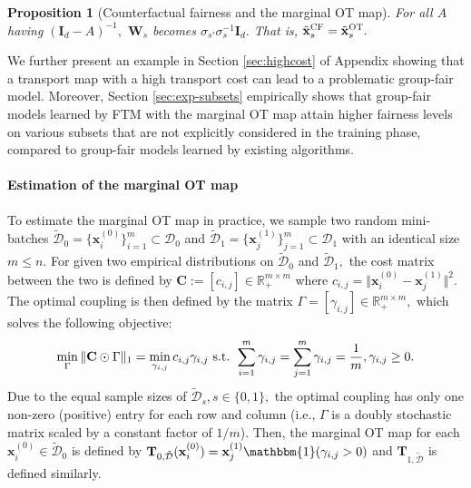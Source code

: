 \documentclass[10pt]{article} %
\newtheorem{proposition}[theorem]{Proposition}
\begin{document}
\begin{proposition}[Counterfactual fairness and the marginal OT map]\label{prop:cf}
    For all $A$ having $(\mathbf{I}_{d}-A)^{-1},$
    $\mathbf{W}_s$ becomes $ \sigma_{s'} \sigma_{s}^{-1} \mathbf{I}_{d}.$
    That is, $\tilde{\mathbf{x}}_{s}^{\textsc{CF}} = \tilde{\mathbf{x}}_{s}^{\textsc{OT}}.$
\end{proposition}

We further present an example in Section \ref{sec:highcost} of Appendix showing that a transport map with a high transport cost can lead to a problematic group-fair model.
Moreover, Section \ref{sec:exp-subsets} empirically shows that group-fair models learned by FTM with the marginal OT map attain higher fairness levels on various subsets that are not explicitly considered in the training phase, compared to group-fair models learned by existing algorithms.

\paragraph{Estimation of the marginal OT map}

To estimate the marginal OT map in practice, we sample two random mini-batches $\tilde{\mathcal{D}}_{0} = \{ \mathbf{x}_{i}^{(0)} \}_{i=1}^{m} \subset \mathcal{D}_{0}$ and $\tilde{\mathcal{D}}_{1} = \{ \mathbf{x}_{j}^{(1)}\}_{j=1}^{m} \subset \mathcal{D}_{1}$ with an identical size $m \le n.$
For given two empirical distributions on $\tilde{\mathcal{D}}_{0}$ and $\tilde{\mathcal{D}}_{1},$
the cost matrix between the two is defined by
$\mathbf{C} := [c_{i, j}] \in \mathbb{R}_{+}^{m \times m}$ where $ c_{i, j} = \Vert \mathbf{x}_{i}^{(0)} - \mathbf{x}_{j}^{(1)} \Vert^{2}.$
The optimal coupling is then defined by the matrix $\Gamma = [\gamma_{i, j}] \in \mathbb{R}_{+}^{m \times m},$ which solves the following objective:
\begin{equation}\label{eq:otproblem}
    \min_{\Gamma} \Vert \mathbf{C} \odot \Gamma \Vert_{1}
    = \min_{\gamma_{i, j}} c_{i, j} \gamma_{i, j}
    \textup{ s.t. }
    \sum_{i=1}^{m} \gamma_{i, j} = \sum_{j=1}^{m} \gamma_{i, j} = \frac{1}{m},
    \gamma_{i, j} \ge 0.    
\end{equation}
Due to the equal sample sizes of $\tilde{\mathcal{D}}_{s}, s\in \{0,1\},$ the optimal coupling has only one non-zero (positive) entry for each row and column (i.e., $\Gamma$ is a doubly stochastic matrix scaled by a constant factor of $1/m$).
Then, the marginal OT map for each $\mathbf{x}_{i}^{(0)} \in \tilde{\mathcal{D}}_{0}$ is defined by $\mathbf{T}_{0, \tilde{\mathcal{D}}}(\mathbf{x}_{i}^{(0)}) = \mathbf{x}_{j}^{(1)} \mathbbm{1}(\gamma_{i, j} > 0)$ and $\mathbf{T}_{1, \tilde{\mathcal{D}}}$ is defined similarly.
\end{document}
